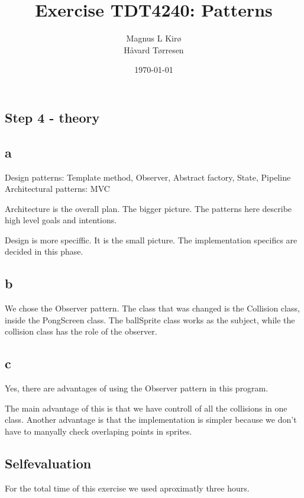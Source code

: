 \documentclass[12pt, a4paper]{article}
\title{Exercise TDT4240: Patterns}
\author{
        Magnus L Kirø \\
		Håvard Tørresen
}
\date{\today}
\begin{document}
\maketitle
{}

\subsection{Step 4 - theory}

\subsection{a} 

Design patterns: Template method, Observer, Abstract factory, State, Pipeline
Architectural patterns: MVC


Architecture is the overall plan. The bigger picture. The patterns here describe high level goals and intentions. 

Design is more speciffic. It is the small picture. The implementation specifics are decided in this phase. 

\subsection{b} %
We chose the Observer pattern. The class that was changed is the Collision class, inside the PongScreen class. 
The ballSprite class works as the subject, while the collision class has the role of the observer.  

\subsection{c} %
Yes, there are advantages of using the Observer pattern in this program. 

The main advantage of this is that we have controll of all the collisions in one class. 
Another advantage is that the implementation is simpler because we don't have to manyally check overlaping points in sprites. 

\subsection{Selfevaluation}
For the total time of this exercise we used aproximatly three hours. 
\end{document}
